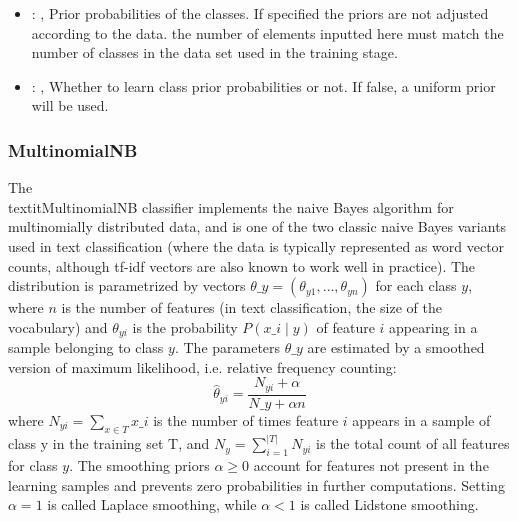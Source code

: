 \begin{itemize}
    \item {}: ,
      Prior probabilities of the classes. If specified the priors are
      not adjusted according to the data. \nb the number of elements inputted here must
      match the number of classes in the data set used in the training stage.

    \item {}: ,
      Whether to learn class prior probabilities or not. If false, a uniform
      prior will be used.
  \end{itemize}


\subsubsection{MultinomialNB}
  The \\textit{MultinomialNB} classifier implements the naive Bayes algorithm for
  multinomially distributed data, and is one of the two classic naive Bayes
  variants used in text classification (where the data is typically represented
  as word vector counts, although tf-idf vectors are also known to work well in
  practice).                         The distribution is parametrized by vectors $\theta\_y =
  (\theta_{y1},\ldots,\theta_{yn})$ for each class $y$, where $n$ is the number of
  features (in text classification, the size of the vocabulary) and $\theta_{yi}$
  is the probability $P(x\_i \mid y)$ of feature $i$ appearing in a sample
  belonging to class $y$.                         The parameters $\theta\_y$ are estimated by a
  smoothed version of maximum                         likelihood, i.e. relative frequency counting:
  \begin{equation}                         \hat{\theta}_{yi} = \frac{ N_{yi} + \alpha}{N\_y + \alpha
  n}                         \end{equation}                         where $N_{yi} = \sum_{x \in T}
  x\_i$ is the number of times feature $i$ appears                         in a sample of class y in
  the training set T, and                         $N_{y} = \sum_{i=1}^{|T|} N_{yi}$ is the total
  count of all features for class                         $y$.                         The smoothing
  priors $\alpha \ge 0$ account for features not present in the                         learning
  samples and prevents zero probabilities in further computations.                         Setting
  $\alpha = 1$ is called Laplace smoothing, while $\alpha < 1$ is called
  Lidstone smoothing.                         

